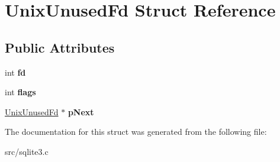 \hypertarget{struct_unix_unused_fd}{\section{Unix\-Unused\-Fd Struct Reference}
\label{struct_unix_unused_fd}
}
\subsection*{Public Attributes}
\begin{DoxyCompactItemize}
\item 
\hypertarget{struct_unix_unused_fd_a3f1a6127218af971aeb7b131c9c1600d}{int {\bfseries fd}}\label{struct_unix_unused_fd_a3f1a6127218af971aeb7b131c9c1600d}

\item 
\hypertarget{struct_unix_unused_fd_a744cd118bd91ec2019108e8205708684}{int {\bfseries flags}}\label{struct_unix_unused_fd_a744cd118bd91ec2019108e8205708684}

\item 
\hypertarget{struct_unix_unused_fd_a6bbcba75beeabdd2df126638bc1d8bc0}{\hyperlink{struct_unix_unused_fd}{Unix\-Unused\-Fd} $\ast$ {\bfseries p\-Next}}\label{struct_unix_unused_fd_a6bbcba75beeabdd2df126638bc1d8bc0}

\end{DoxyCompactItemize}


The documentation for this struct was generated from the following file\-:\begin{DoxyCompactItemize}
\item 
src/sqlite3.\-c\end{DoxyCompactItemize}
